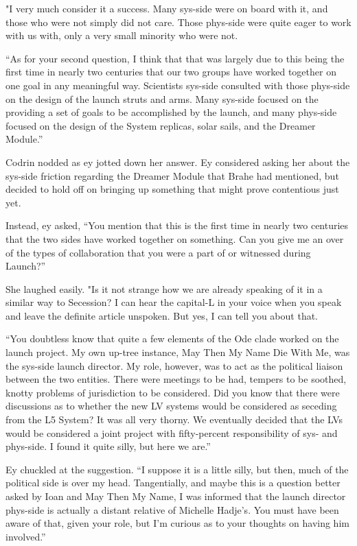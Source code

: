 "I very much consider it a success. Many sys-side were on board with it, and those who were not simply did not care. Those phys-side were quite eager to work with us with, only a very small minority who were not.

``As for your second question, I think that that was largely due to this being the first time in nearly two centuries that our two groups have worked together on one goal in any meaningful way. Scientists sys-side consulted with those phys-side on the design of the launch struts and arms. Many sys-side focused on the providing a set of goals to be accomplished by the launch, and many phys-side focused on the design of the System replicas, solar sails, and the Dreamer Module.''

Codrin nodded as ey jotted down her answer. Ey considered asking her about the sys-side friction regarding the Dreamer Module that Brahe had mentioned, but decided to hold off on bringing up something that might prove contentious just yet.

Instead, ey asked, ``You mention that this is the first time in nearly two centuries that the two sides have worked together on something. Can you give me an over of the types of collaboration that you were a part of or witnessed during Launch?''

She laughed easily. "Is it not strange how we are already speaking of it in a similar way to Secession? I can hear the capital-L in your voice when you speak and leave the definite article unspoken. But yes, I can tell you about that.

``You doubtless know that quite a few elements of the Ode clade worked on the launch project. My own up-tree instance, May Then My Name Die With Me, was the sys-side launch director. My role, however, was to act as the political liaison between the two entities. There were meetings to be had, tempers to be soothed, knotty problems of jurisdiction to be considered. Did you know that there were discussions as to whether the new LV systems would be considered as seceding from the L5 System? It was all very thorny. We eventually decided that the LVs would be considered a joint project with fifty-percent responsibility of sys- and phys-side. I found it quite silly, but here we are.''

Ey chuckled at the suggestion. ``I suppose it is a little silly, but then, much of the political side is over my head. Tangentially, and maybe this is a question better asked by Ioan and May Then My Name, I was informed that the launch director phys-side is actually a distant relative of Michelle Hadje's. You must have been aware of that, given your role, but I'm curious as to your thoughts on having him involved.''

